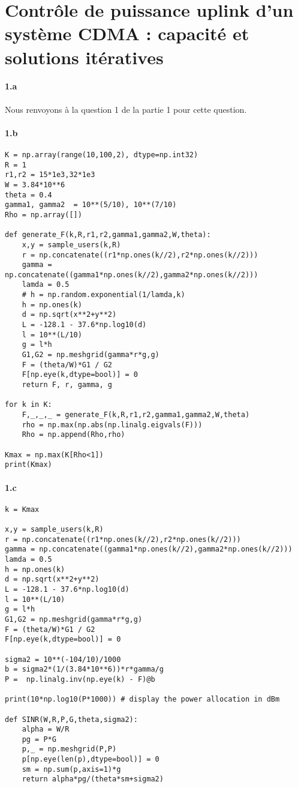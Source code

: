 \documentclass[a4paper,11pt,2]{article}
\begin{document}
\section{Contrôle de puissance uplink d'un système CDMA : capacité et solutions itératives}
\paragraph{1.a} Nous renvoyons à la question 1 de la partie 1 pour cette question.

\paragraph{1.b}
\begin{center}
\begin{lstlisting}
K = np.array(range(10,100,2), dtype=np.int32)
R = 1
r1,r2 = 15*1e3,32*1e3
W = 3.84*10**6
theta = 0.4
gamma1, gamma2  = 10**(5/10), 10**(7/10)
Rho = np.array([])

def generate_F(k,R,r1,r2,gamma1,gamma2,W,theta):
    x,y = sample_users(k,R)
    r = np.concatenate((r1*np.ones(k//2),r2*np.ones(k//2)))
    gamma = np.concatenate((gamma1*np.ones(k//2),gamma2*np.ones(k//2)))
    lamda = 0.5
    # h = np.random.exponential(1/lamda,k)
    h = np.ones(k)
    d = np.sqrt(x**2+y**2)
    L = -128.1 - 37.6*np.log10(d)
    l = 10**(L/10)
    g = l*h
    G1,G2 = np.meshgrid(gamma*r*g,g)
    F = (theta/W)*G1 / G2
    F[np.eye(k,dtype=bool)] = 0
    return F, r, gamma, g

for k in K:
    F,_,_,_ = generate_F(k,R,r1,r2,gamma1,gamma2,W,theta)
    rho = np.max(np.abs(np.linalg.eigvals(F)))
    Rho = np.append(Rho,rho)

Kmax = np.max(K[Rho<1])
print(Kmax)
\end{lstlisting}
\end{center}

\paragraph{1.c}
\begin{center}
\begin{lstlisting}
k = Kmax

x,y = sample_users(k,R)
r = np.concatenate((r1*np.ones(k//2),r2*np.ones(k//2)))
gamma = np.concatenate((gamma1*np.ones(k//2),gamma2*np.ones(k//2)))
lamda = 0.5
h = np.ones(k)
d = np.sqrt(x**2+y**2)
L = -128.1 - 37.6*np.log10(d)
l = 10**(L/10)
g = l*h
G1,G2 = np.meshgrid(gamma*r*g,g)
F = (theta/W)*G1 / G2
F[np.eye(k,dtype=bool)] = 0

sigma2 = 10**(-104/10)/1000
b = sigma2*(1/(3.84*10**6))*r*gamma/g
P =  np.linalg.inv(np.eye(k) - F)@b

print(10*np.log10(P*1000)) # display the power allocation in dBm

def SINR(W,R,P,G,theta,sigma2):
    alpha = W/R
    pg = P*G
    p,_ = np.meshgrid(P,P)
    p[np.eye(len(p),dtype=bool)] = 0
    sm = np.sum(p,axis=1)*g
    return alpha*pg/(theta*sm+sigma2)
\end{lstlisting}
\end{center}
\end{document}
